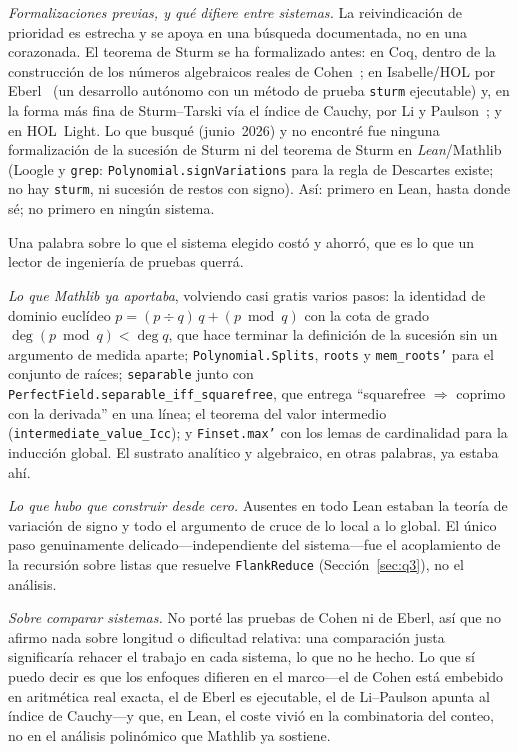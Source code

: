 \documentclass[11pt]{article}
\newcommand{\lean}[1]{\texttt{#1}}
\begin{document}
\emph{Formalizaciones previas, y qu\'e difiere entre sistemas.} La reivindicaci\'on de prioridad es
estrecha y se apoya en una b\'usqueda documentada, no en una corazonada. El teorema de Sturm se ha
formalizado antes: en Coq, dentro de la construcci\'on de los n\'umeros algebraicos reales de
Cohen~\cite{cohen}; en Isabelle/HOL por Eberl~\cite{eberl} (un desarrollo aut\'onomo con un m\'etodo
de prueba \lean{sturm} ejecutable) y, en la forma m\'as fina de Sturm--Tarski v\'ia el \'indice de
Cauchy, por Li y Paulson~\cite{litarski,libudan}; y en HOL~Light. Lo que busqu\'e (junio~2026) y no
encontr\'e fue ninguna formalizaci\'on de la sucesi\'on de Sturm ni del teorema de Sturm en
\emph{Lean}/Mathlib (Loogle y \lean{grep}: \lean{Polynomial.signVariations} para la regla de
Descartes existe; no hay \lean{sturm}, ni sucesi\'on de restos con signo). As\'i: primero en Lean,
hasta donde s\'e; no primero en ning\'un sistema.

Una palabra sobre lo que el sistema elegido cost\'o y ahorr\'o, que es lo que un lector de
ingenier\'ia de pruebas querr\'a.

\emph{Lo que Mathlib ya aportaba}, volviendo casi gratis varios pasos: la identidad de dominio
eucl\'ideo $p = (p\div q)\,q + (p\bmod q)$ con la cota de grado $\deg(p\bmod q)<\deg q$, que hace
terminar la definici\'on de la sucesi\'on sin un argumento de medida aparte; \lean{Polynomial.Splits},
\lean{roots} y \lean{mem\_roots'} para el conjunto de ra\'ices; \lean{separable} junto con
\lean{PerfectField.separable\_iff\_squarefree}, que entrega ``squarefree $\Rightarrow$ coprimo con la
derivada'' en una l\'inea; el teorema del valor intermedio (\lean{intermediate\_value\_Icc}); y
\lean{Finset.max'} con los lemas de cardinalidad para la inducci\'on global. El sustrato anal\'itico y
algebraico, en otras palabras, ya estaba ah\'i.

\emph{Lo que hubo que construir desde cero.} Ausentes en todo Lean estaban la teor\'ia de variaci\'on
de signo y todo el argumento de cruce de lo local a lo global. El \'unico paso genuinamente
delicado---independiente del sistema---fue el acoplamiento de la recursi\'on sobre listas que resuelve
\lean{FlankReduce} (Secci\'on~\ref{sec:q3}), no el an\'alisis.

\emph{Sobre comparar sistemas.} No port\'e las pruebas de Cohen ni de Eberl, as\'i que no afirmo nada
sobre longitud o dificultad relativa: una comparaci\'on justa significar\'ia rehacer el trabajo en
cada sistema, lo que no he hecho. Lo que s\'i puedo decir es que los enfoques difieren en el
marco---el de Cohen est\'a embebido en aritm\'etica real exacta, el de Eberl es ejecutable, el de
Li--Paulson apunta al \'indice de Cauchy---y que, en Lean, el coste vivi\'o en la combinatoria del
conteo, no en el an\'alisis polin\'omico que Mathlib ya sostiene.
\end{document}
